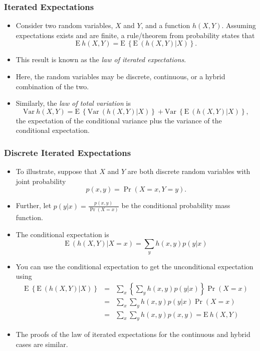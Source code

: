 \documentclass{beamer}
\begin{document}
\begin{frame}
 \frametitle{Iterated Expectations}
\begin{itemize}
   \item Consider two random variables, $X$ and $Y$, and a function $h(X,Y)$. Assuming expectations exists and are finite, a rule/theorem from probability states that
$$\mathrm{E~} h(X,Y)= \mathrm{E~} \left\{ \mathrm{E~} \left( h(X,Y) | X \right) \right \} .$$
\item This result is known as the \textit{law of iterated expectations}.
\item Here, the random variables may be discrete, continuous, or a hybrid combination of the two.
\item Similarly, the \textit{law of total variation} is
$$\mathrm{Var~} h(X,Y)= \mathrm{E~} \left\{ \mathrm{Var~} \left( h(X,Y) | X \right) \right \}
+\mathrm{Var~} \left\{ \mathrm{E~} \left( h(X,Y) | X \right) \right \}, $$
the expectation of the conditional variance plus the variance of the conditional expectation.
 \end{itemize}
\end{frame}


\begin{frame}[shrink=2]
 \frametitle{Discrete Iterated Expectations}
\begin{itemize}
   \item To illustrate, suppose that $X$ and $Y$ are both discrete random variables with joint probability
$$ p(x,y) = \Pr(X=x, Y=y).$$
\item Further, let $p(y|x) = \frac{p(x,y)}{\Pr(X=x)}$ be the conditional probability mass function.
\item The conditional expectation is
$$  \mathrm{E~} \left( h(X,Y) | X=x \right) = \sum_y h(x,y) p(y|x)$$
\item You can use the conditional expectation to get the unconditional expectation using
\begin{eqnarray*} \mathrm{E~} \left\{ \mathrm{E~} \left( h(X,Y) | X \right) \right \}
&=& \sum_x  \left\{\sum_y h(x,y) p(y|x) \right \} \Pr(X=x) \\
&=& \sum_x  \sum_y h(x,y) p(y|x)  \Pr(X=x) \\
&=&  \sum_x  \sum_y h(x,y) p(x,y)
=  \mathrm{E~} h(X,Y)
\end{eqnarray*}
\item The proofs of the law of iterated expectations for the continuous and hybrid cases are similar.
 \end{itemize}
\end{frame}
\end{document}
